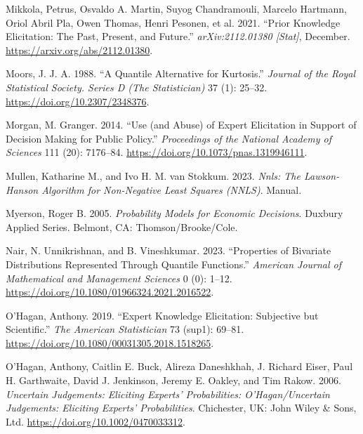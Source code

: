 \documentclass[
]{interact}
\newlength{\cslhangindent}
\newenvironment{CSLReferences}[2] %
 {\begin{list}{}{%
  \setlength{\itemindent}{0pt}
  \setlength{\leftmargin}{0pt}
  \setlength{\parsep}{0pt}
  \ifodd #1
   \setlength{\leftmargin}{\cslhangindent}
   \setlength{\itemindent}{-1\cslhangindent}
  \fi
  \setlength{\itemsep}{#2\baselineskip}}}
 {\end{list}}
\begin{document}
\begin{CSLReferences}{1}{0}
Mikkola, Petrus, Osvaldo A. Martin, Suyog Chandramouli, Marcelo
Hartmann, Oriol Abril Pla, Owen Thomas, Henri Pesonen, et al. 2021.
{``Prior Knowledge Elicitation: {The} Past, Present, and Future.''}
\emph{arXiv:2112.01380 {[}Stat{]}}, December.
\url{https://arxiv.org/abs/2112.01380}.

Moors, J. J. A. 1988. {``A {Quantile Alternative} for {Kurtosis}.''}
\emph{Journal of the Royal Statistical Society. Series D (The
Statistician)} 37 (1): 25--32. \url{https://doi.org/10.2307/2348376}.

Morgan, M. Granger. 2014. {``Use (and Abuse) of Expert Elicitation in
Support of Decision Making for Public Policy.''} \emph{Proceedings of
the National Academy of Sciences} 111 (20): 7176--84.
\url{https://doi.org/10.1073/pnas.1319946111}.

Mullen, Katharine M., and Ivo H. M. van Stokkum. 2023. \emph{Nnls: {The}
Lawson-Hanson Algorithm for Non-Negative Least Squares ({NNLS})}.
Manual.

Myerson, Roger B. 2005. \emph{Probability Models for Economic
Decisions}. Duxbury Applied Series. Belmont, CA: Thomson/Brooke/Cole.

Nair, N. Unnikrishnan, and B. Vineshkumar. 2023. {``Properties of
{Bivariate Distributions Represented} Through {Quantile Functions}.''}
\emph{American Journal of Mathematical and Management Sciences} 0 (0):
1--12. \url{https://doi.org/10.1080/01966324.2021.2016522}.

O'Hagan, Anthony. 2019. {``Expert {Knowledge Elicitation}: {Subjective}
but {Scientific}.''} \emph{The American Statistician} 73 (sup1): 69--81.
\url{https://doi.org/10.1080/00031305.2018.1518265}.

O'Hagan, Anthony, Caitlin E. Buck, Alireza Daneshkhah, J. Richard Eiser,
Paul H. Garthwaite, David J. Jenkinson, Jeremy E. Oakley, and Tim Rakow.
2006. \emph{Uncertain {Judgements}: {Eliciting Experts}'
{Probabilities}: {O}'{Hagan}/{Uncertain Judgements}: {Eliciting
Experts}' {Probabilities}}. Chichester, UK: John Wiley \& Sons, Ltd.
\url{https://doi.org/10.1002/0470033312}.


\end{CSLReferences}
\end{document}
